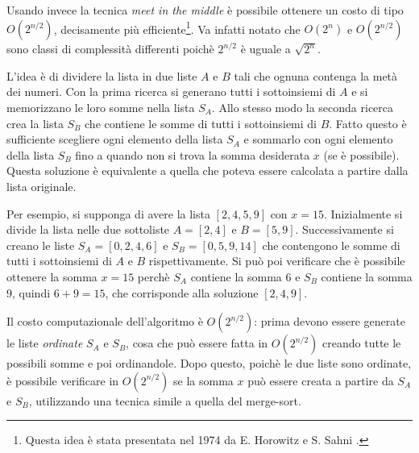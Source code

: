 Usando invece la tecnica \textit{meet in the middle} è 
possibile ottenere un costo di tipo $O(2^{n/2})$, decisamente più efficiente\footnote{Questa idea è stata presentata
nel 1974 da E. Horowitz e S. Sahni \cite{hor74}.}.
Va infatti notato che $O(2^n)$ e $O(2^{n/2})$ sono classi di
complessità differenti poichè $2^{n/2}$ è uguale a $\sqrt{2^n}$.

L'idea è di dividere la lista in due liste $A$ e $B$ tali che ognuna 
contenga la metà dei numeri.
Con la prima ricerca si generano tutti i sottoinsiemi di $A$
e si memorizzano le loro somme nella lista $S_A$.
Allo stesso modo la seconda ricerca crea la lista $S_B$ 
che contiene le somme di tutti i sottoinsiemi di $B$.
Fatto questo è sufficiente scegliere ogni elemento della lista $S_A$ 
e sommarlo con ogni elemento della lista $S_B$ fino a quando
non si trova la somma desiderata $x$ (se è possibile).
Questa soluzione è equivalente a quella che poteva essere
calcolata a partire dalla lista originale.

Per esempio, si supponga di avere la lista $[2,4,5,9]$ con $x=15$.
Inizialmente si divide la lista nelle due sottoliste
$A=[2,4]$ e $B=[5,9]$.
Successivamente si creano le liste
$S_A=[0,2,4,6]$ e $S_B=[0,5,9,14]$ che contengono
le somme di tutti i sottoinsiemi di $A$ e $B$ rispettivamente.
Si può poi verificare che è possibile ottenere la somma
$x=15$ perchè $S_A$ contiene la somma $6$ e 
$S_B$ contiene la somma $9$, quindi $6+9=15$,
che corrisponde alla soluzione $[2,4,9]$.

Il costo computazionale dell'algoritmo è $O(2^{n/2})$:
prima devono essere generate le liste \emph{ordinate} $S_A$ e $S_B$,
cosa che può essere fatta in $O(2^{n/2})$ creando tutte le possibili somme e poi ordinandole.
Dopo questo, poichè le due liste sono ordinate, è possibile 
verificare in $O(2^{n/2})$ se la somma $x$ può essere creata a partire
da $S_A$ e $S_B$, utilizzando una tecnica simile a quella del merge-sort.